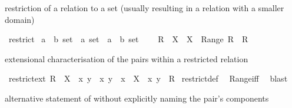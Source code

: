 \begin{isabellebody}
\isamarkuptrue%
%
\begin{isamarkuptext}%
restriction of a relation to a set (usually resulting in a relation with a smaller domain)%
\end{isamarkuptext}%
\isamarkuptrue%
\isamarkupfalse%
\ restrict\isanewline
\isanewline
{\isacharcolon}{\isacharcolon}\ {\isachardoublequoteopen}{\isacharparenleft}{\isacharprime}a\ {\isasymtimes}\ {\isacharprime}b{\isacharparenright}\ set\ {\isasymRightarrow}\ {\isacharprime}a\ set\ {\isasymRightarrow}\ {\isacharparenleft}{\isacharprime}a\ {\isasymtimes}\ {\isacharprime}b{\isacharparenright}\ set{\isachardoublequoteclose}\ {\isacharparenleft}\ {\isachardoublequoteopen}{\isacharbar}{\isacharbar}{\isachardoublequoteclose}\ {}{}{\isacharparenright}\isanewline
{}\ {\isachardoublequoteopen}R\ {\isacharbar}{\isacharbar}\ X\ {\isacharequal}\ X\ {\isasymtimes}\ Range\ R\ {\isasyminter}\ R{\isachardoublequoteclose}%
\begin{isamarkuptext}%
extensional characterisation of the pairs within a restricted relation%
\end{isamarkuptext}%
\isamarkuptrue%
\isamarkupfalse%
\ restrict{\isacharunderscore}ext{\isacharcolon}\ {\isachardoublequoteopen}R\ {\isacharbar}{\isacharbar}\ X\ {\isacharequal}\ {\isacharbraceleft}{\isacharparenleft}x{\isacharcomma}\ y{\isacharparenright}\ {\isacharbar}\ x\ y\ {\isachardot}\ x\ {\isasymin}\ X\ {\isasymand}\ {\isacharparenleft}x{\isacharcomma}\ y{\isacharparenright}\ {\isasymin}\ R{\isacharbraceright}{\isachardoublequoteclose}\isanewline
%
\isadelimproof
%
\endisadelimproof
%
\isatagproof
{}\isamarkupfalse%
\ restrict{\isacharunderscore}def\ \isamarkupfalse%
\ Range{\isacharunderscore}iff\ \isamarkupfalse%
\ blast%
\endisatagproof
{\isafoldproof}%
%
\isadelimproof
%
\endisadelimproof
%
\begin{isamarkuptext}%
alternative statement of  without explicitly naming the pair's components%
\end{isamarkuptext}%
\isamarkuptrue%
\isamarkupfalse%

\end{isabellebody}
